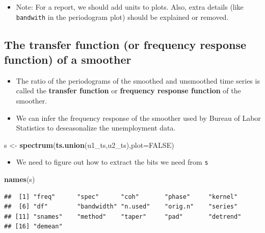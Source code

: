 \documentclass[]{article}
\newenvironment{Shaded}{\begin{snugshade}}{\end{snugshade}}
\newcommand{\KeywordTok}[1]{\textcolor[rgb]{0.13,0.29,0.53}{\textbf{#1}}}
\newcommand{\DataTypeTok}[1]{\textcolor[rgb]{0.13,0.29,0.53}{#1}}
\newcommand{\StringTok}[1]{\textcolor[rgb]{0.31,0.60,0.02}{#1}}
\newcommand{\OtherTok}[1]{\textcolor[rgb]{0.56,0.35,0.01}{#1}}
\newcommand{\NormalTok}[1]{#1}
\providecommand{\tightlist}{%
  \setlength{\itemsep}{0pt}\setlength{\parskip}{0pt}}
\begin{document}
\begin{itemize}
\tightlist
\item
  Note: For a report, we should add units to plots. Also, extra details
  (like \texttt{bandwith} in the periodogram plot) should be explained
  or removed.
\end{itemize}

\subsection{The transfer function (or frequency response function) of a
smoother}\label{the-transfer-function-or-frequency-response-function-of-a-smoother}

\begin{itemize}
\item
  The ratio of the periodograms of the smoothed and unsmoothed time
  series is called the \textbf{transfer function} or \textbf{frequency
  response function} of the smoother.
\item
  We can infer the frequency response of the smoother used by Bureau of
  Labor Statistics to deseasonalize the unemployment data.
\end{itemize}

\begin{Shaded}
\begin{Highlighting}[]
\NormalTok{s <-}\StringTok{ }\KeywordTok{spectrum}\NormalTok{(}\KeywordTok{ts.union}\NormalTok{(u1_ts,u2_ts),}\DataTypeTok{plot=}\OtherTok{FALSE}\NormalTok{)}
\end{Highlighting}
\end{Shaded}

\begin{itemize}
\tightlist
\item
  We need to figure out how to extract the bits we need from \texttt{s}
\end{itemize}

\begin{Shaded}
\begin{Highlighting}[]
\KeywordTok{names}\NormalTok{(s)}
\end{Highlighting}
\end{Shaded}

\begin{verbatim}
##  [1] "freq"      "spec"      "coh"       "phase"     "kernel"   
##  [6] "df"        "bandwidth" "n.used"    "orig.n"    "series"   
## [11] "snames"    "method"    "taper"     "pad"       "detrend"  
## [16] "demean"
\end{verbatim}
\end{document}
